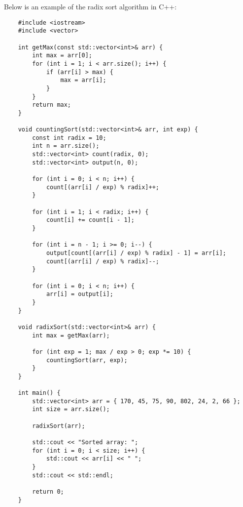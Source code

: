\begin{solution}
    Below is an example of the radix sort algorithm in C++:

    \horizontalline

    \begin{verbatim}
    #include <iostream>
    #include <vector>
    
    int getMax(const std::vector<int>& arr) {
        int max = arr[0];
        for (int i = 1; i < arr.size(); i++) {
            if (arr[i] > max) {
                max = arr[i];
            }
        }
        return max;
    }
    
    void countingSort(std::vector<int>& arr, int exp) {
        const int radix = 10;
        int n = arr.size();
        std::vector<int> count(radix, 0);
        std::vector<int> output(n, 0);
    
        for (int i = 0; i < n; i++) {
            count[(arr[i] / exp) % radix]++;
        }
    
        for (int i = 1; i < radix; i++) {
            count[i] += count[i - 1];
        }
    
        for (int i = n - 1; i >= 0; i--) {
            output[count[(arr[i] / exp) % radix] - 1] = arr[i];
            count[(arr[i] / exp) % radix]--;
        }
    
        for (int i = 0; i < n; i++) {
            arr[i] = output[i];
        }
    }
    
    void radixSort(std::vector<int>& arr) {
        int max = getMax(arr);
    
        for (int exp = 1; max / exp > 0; exp *= 10) {
            countingSort(arr, exp);
        }
    }
    
    int main() {
        std::vector<int> arr = { 170, 45, 75, 90, 802, 24, 2, 66 };
        int size = arr.size();
    
        radixSort(arr);
    
        std::cout << "Sorted array: ";
        for (int i = 0; i < size; i++) {
            std::cout << arr[i] << " ";
        }
        std::cout << std::endl;
    
        return 0;
    }
    \end{verbatim}

    \horizontalline


\end{solution}
